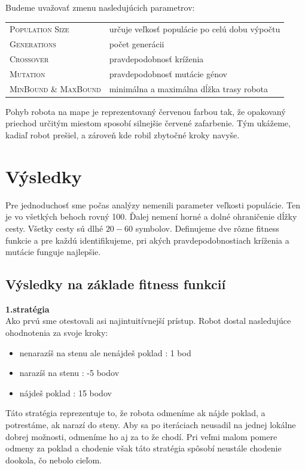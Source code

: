 \documentclass[10pt]{paper}
\begin{document}
Budeme uvažovať zmenu nasledujúcich parametrov:

\begin{tabular}{ll}
\hline
\textsc{Population Size} & určuje veľkosť populácie po celú dobu výpočtu \\ 
\textsc{Generations} & počet generácii \\
\textsc{Crossover}  & pravdepodobnosť kríženia  \\
\textsc{Mutation}  &  pravdepodobnosť mutácie génov  \\
\textsc{MinBound \& MaxBound}  &  minimálna a maximálna dĺžka trasy robota \\ \hline
\end{tabular}

Pohyb robota na mape je reprezentovaný červenou farbou tak, že opakovaný priechod určitým miestom sposobí silnejšie červené zafarbenie. Tým ukážeme, kadiaľ robot prešiel, a zároveň kde robil zbytočné kroky navyše.

\section{Výsledky}

Pre jednoduchosť sme počas analýzy nemenili parameter veľkosti populácie. Ten je vo všetkých behoch rovný 100. Ďalej nemení horné a dolné ohraničenie dĺžky cesty. Všetky cesty sú dlhé $20-60$ symbolov. Definujeme dve rôzne fitness funkcie a pre každú identifikujeme, pri akých pravdepodobnostiach kríženia a mutácie funguje najlepšie. 


\subsection{Výsledky na základe fitness funkcií}
\textbf{1.stratégia}\\
Ako prvú sme otestovali asi najintuitívnejší prístup. Robot dostal nasledujúce ohodnotenia za svoje kroky:
\begin{itemize}
\item nenarazíš na stenu ale nenájdeš poklad : 1 bod
\item narazíš na stenu : -5 bodov
\item nájdeš poklad : 15 bodov
\end{itemize}
Táto stratégia reprezentuje to, že robota odmeníme ak nájde poklad, a potrestáme, ak narazí do steny. Aby sa po iteráciach neusadil na jednej lokálne dobrej možnosti, odmeníme ho aj za to že chodí. Pri veľmi malom pomere odmeny za poklad a chodenie však táto stratégia spôsobí neustále chodenie dookola, čo nebolo cieľom.
\end{document}
